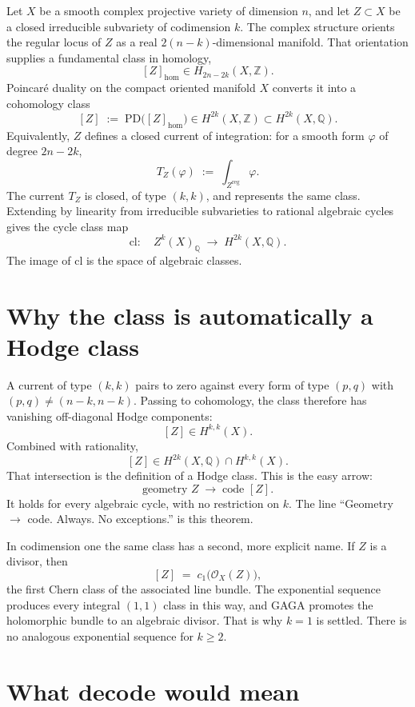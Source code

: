 \documentclass[11pt,a4paper]{article}
\newcommand{\Q}{\mathbb{Q}}
\newcommand{\Z}{\mathbb{Z}}
\theoremstyle{definition}
\theoremstyle{remark}
\begin{document}
Let \(X\) be a smooth complex projective variety of dimension \(n\), and
let \(Z\subset X\) be a closed irreducible subvariety of codimension
\(k\). The complex structure orients the regular locus of \(Z\) as a
real \(2(n-k)\)-dimensional manifold. That orientation supplies a
fundamental class in homology,
\[
[Z]_{\mathrm{hom}}\in H_{2n-2k}(X,\Z).
\]
Poincar\'e duality on the compact oriented manifold \(X\) converts it
into a cohomology class
\[
[Z]\;:=\;\mathrm{PD}\bigl([Z]_{\mathrm{hom}}\bigr)
\in H^{2k}(X,\Z)\subset H^{2k}(X,\Q).
\]
Equivalently, \(Z\) defines a closed current of integration: for a
smooth form \(\varphi\) of degree \(2n-2k\),
\[
T_Z(\varphi)\;:=\;\int_{Z^{\mathrm{reg}}}\varphi.
\]
The current \(T_Z\) is closed, of type \((k,k)\), and represents the
same class. Extending by linearity from irreducible subvarieties to
rational algebraic cycles gives the cycle class map
\[
\mathrm{cl}\colon\quad Z^k(X)_{\Q}\;\longrightarrow\; H^{2k}(X,\Q).
\]
The image of \(\mathrm{cl}\) is the space of algebraic classes.

\section{Why the class is automatically a Hodge class}

A current of type \((k,k)\) pairs to zero against every form of type
\((p,q)\) with \((p,q)\neq(n-k,n-k)\). Passing to cohomology, the class
therefore has vanishing off-diagonal Hodge components:
\[
[Z]\in H^{k,k}(X).
\]
Combined with rationality,
\[
[Z]\in H^{2k}(X,\Q)\cap H^{k,k}(X).
\]
That intersection is the definition of a Hodge class. This is the easy
arrow:
\[
\text{geometry }Z\;\longrightarrow\;\text{code }[Z].
\]
It holds for every algebraic cycle, with no restriction on \(k\). The
line ``Geometry \(\to\) code. Always. No exceptions.'' is this theorem.

In codimension one the same class has a second, more explicit name. If
\(Z\) is a divisor, then
\[
[Z]\;=\;c_1\bigl(\mathcal{O}_X(Z)\bigr),
\]
the first Chern class of the associated line bundle. The exponential
sequence produces every integral \((1,1)\) class in this way, and GAGA
promotes the holomorphic bundle to an algebraic divisor. That is why
\(k=1\) is settled. There is no analogous exponential sequence for
\(k\ge 2\).

\section{What decode would mean}
\end{document}
